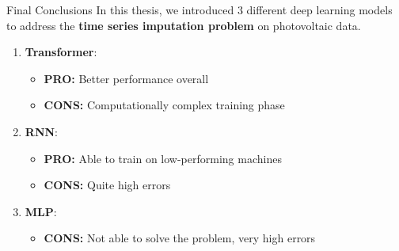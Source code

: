 \begin{frame}{Final Conclusions}
In this thesis, we introduced 3 different deep learning models to address the \textbf{time series imputation problem} on photovoltaic data.

    \begin{enumerate}
        \item \textbf{Transformer}: 
            \begin{itemize}
                \item[] \color{Green4}\textbf{PRO: }\color{black} Better performance overall
                \item[] \color{Red2}\textbf{CONS: }\color{black} Computationally complex training phase
            \end{itemize}
        \item \textbf{RNN}:
        \begin{itemize}
                \item[] \color{Green4}\textbf{PRO: }\color{black} Able to train on low-performing machines
                \item[] \color{Red2}\textbf{CONS: }\color{black} Quite high errors
            \end{itemize}
        \item \textbf{MLP}:
        \begin{itemize}
                \item[] \color{Red2}\textbf{CONS: }\color{black} Not able to solve the problem, very high errors
            \end{itemize}
    \end{enumerate}
\end{frame}